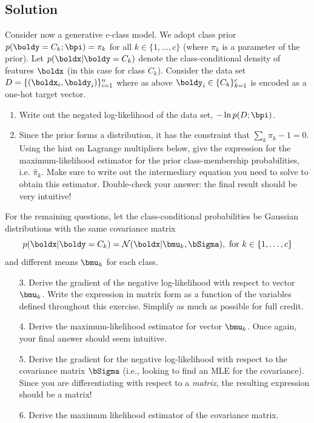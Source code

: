 \documentclass[submit]{harvardml}
\begin{document}
\subsection*{Solution}
\begin{problem}
  Consider now a generative $c$-class model.  We adopt class prior
  $p(\boldy = C_k; \bpi) = \pi_k$ for all $k \in \{1, \ldots, c\}$
(where $\pi_k$ is a parameter of the prior).
%
Let  $p(\boldx|\boldy=C_k)$ denote
the class-conditional density of features $\boldx$ (in this
case for class $C_k$). Consider the data set $D = \{(\boldx_i,
\boldy_i)\}_{i=1}^n$ where as above $\boldy_i \in \{C_k\}_{k=1}^c$ is
encoded as a one-hot target vector.
%
\begin{enumerate}
  \item Write out the negated log-likelihood of the data set,
    $-\ln p(D ; \bpi)$.
%
  \item Since the prior forms a distribution, it has the constraint that
    $\sum_k\pi_k - 1 = 0$.  Using the hint on
Lagrange multipliers below, give the
    expression for the maximum-likelihood estimator for the prior
    class-membership probabilities, i.e.
    $\hat \pi_k.$
    Make sure to write out the intermediary equation you need
    to solve to obtain this estimator. Double-check your answer: the final
    result should be very intuitive!
\end{enumerate}
    For the remaining questions, let the
    class-conditional probabilities be Gaussian distributions with
the same covariance matrix
    $$p(\boldx | \boldy = C_k) = \mathcal{N}(\boldx |  \bmu_k, \bSigma), \text{\ for\ }k \in \{1,\ldots, c\}$$
%
and different means $\bmu_k$ for each class.
%
    \begin{enumerate}
  \item[3.] Derive the gradient of the negative log-likelihood with respect to vector $\bmu_k$.
    Write the expression in matrix form as a function of the variables defined
    throughout this exercise. Simplify as much as possible for full credit.
  \item[4.] Derive the maximum-likelihood estimator for vector $\bmu_k$. Once
    again, your final answer should seem intuitive.
  \item[5.] Derive the gradient for the negative log-likelihood with respect to the
    covariance matrix $\bSigma$ (i.e., looking
to find an MLE for the covariance).
Since you are differentiating with respect to a
    \emph{matrix}, the resulting expression should be a matrix!
%
  \item[6.] Derive the maximum likelihood estimator of the covariance matrix.
\end{enumerate}

\end{problem}
\end{document}
